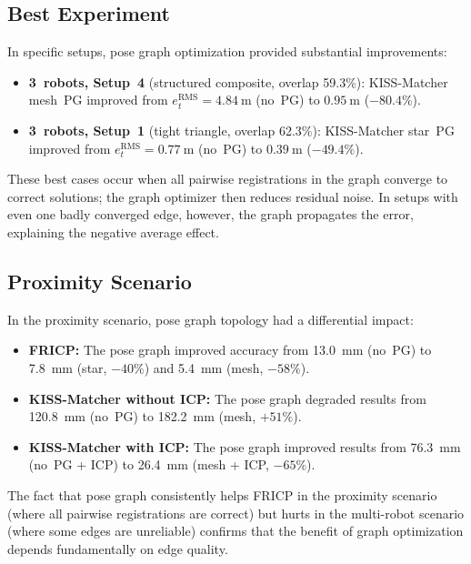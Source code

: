 \subsection{Best Experiment}

In specific setups, pose graph optimization provided substantial
improvements:
\begin{itemize}
    \item \textbf{3~robots, Setup~4} (structured composite,
          overlap 59.3\%): KISS-Matcher mesh~PG improved from
          $e_t^\mathrm{RMS} = \SI{4.84}{\metre}$ (no~PG) to
          $\SI{0.95}{\metre}$ ($-80.4\%$).
    \item \textbf{3~robots, Setup~1} (tight triangle, overlap 62.3\%):
          KISS-Matcher star~PG improved from
          $e_t^\mathrm{RMS} = \SI{0.77}{\metre}$ (no~PG) to
          $\SI{0.39}{\metre}$ ($-49.4\%$).
\end{itemize}

These best cases occur when all pairwise registrations in the
graph converge to correct solutions; the graph optimizer then
reduces residual noise.
In setups with even one badly converged edge, however, the graph
propagates the error, explaining the negative average effect.

\subsection{Proximity Scenario}

In the proximity scenario, pose graph topology had a differential
impact:
\begin{itemize}
    \item \textbf{FRICP:} The pose graph improved accuracy
          from \SI{13.0}{\milli\metre} (no~PG) to
          \SI{7.8}{\milli\metre} (star, $-40\%$) and
          \SI{5.4}{\milli\metre} (mesh, $-58\%$).
    \item \textbf{KISS-Matcher without ICP:} The pose graph
          degraded results from \SI{120.8}{\milli\metre} (no~PG)
          to \SI{182.2}{\milli\metre} (mesh, $+51\%$).
    \item \textbf{KISS-Matcher with ICP:} The pose graph improved
          results from \SI{76.3}{\milli\metre} (no~PG + ICP) to
          \SI{26.4}{\milli\metre} (mesh + ICP, $-65\%$).
\end{itemize}

The fact that pose graph consistently helps FRICP in the
proximity scenario (where all pairwise registrations are correct)
but hurts in the multi-robot scenario (where some edges are
unreliable) confirms that the benefit of graph optimization
depends fundamentally on edge quality.


